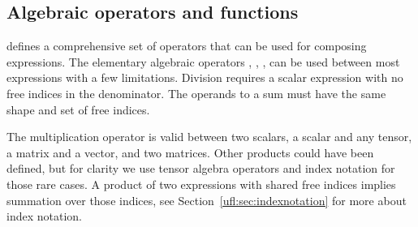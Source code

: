 \subsection{Algebraic operators and functions} \label{ufl:sec:algebra}

\ufl{} defines a comprehensive set of operators
that can be used for composing expressions.
The elementary algebraic operators
\icode{+}, \icode{-}, \icode{*}, \icode{/}
can be used between most \ufl{} expressions with a few limitations.
Division requires a scalar expression with no free indices in the
denominator.  The operands to a sum must have the same shape and set
of free indices.

The multiplication operator \icode{*} is valid between two scalars, a
scalar and any tensor, a matrix and a vector, and two matrices.  Other
products could have been defined, but for clarity we use tensor
algebra operators and index notation for those rare cases.  A product
of two expressions with shared free indices implies summation over
those indices, see Section~\ref{ufl:sec:indexnotation} for more about
index notation.

